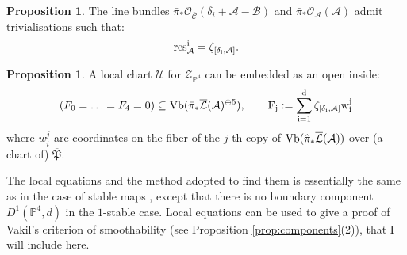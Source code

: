 \documentclass[11pt]{amsart}
\newcommand{\pazocal}{\mathcal}
\newcommand{\PP}{\mathbb P}
\newcommand{\OO}{\mathcal{O}}
\newcommand{\A}{\mathcal A}
\newcommand{\B}{\mathcal B}
\newcommand{\hP}{\overline{\mathfrak{P}}}
\newcommand{\hL}{\overline{\mathcal{L}}}
\theoremstyle{definition}
\newtheorem{prop}[thm]{Proposition}
\theoremstyle{definition}
\begin{document}
\begin{prop}\cite[Proposition 4.13]{HL}
The line bundles $\bar\pi_*\OO_{\overline{\mathcal C}}(\pazocal \delta_i+\A-\B)$ and $\bar\pi_*\OO_{\A}(\A) $ admit trivialisations such that:
\[\rm{res}^i_{\mathcal A}=\zeta_{[\delta_i,\A]}.\]
\end{prop}
\begin{prop}\label{prop:equations} \cite[Theorems 2.17-19]{HL}
A local chart $\pazocal U$ for $\mathcal Z_{\PP^4}$ can be embedded as an open inside:
\[ (F_0=\ldots=F_4=0)\subseteq \rm{Vb}(\bar{\pi}_*\hL(\A)^{\oplus 5}),\qquad F_j:=\sum_{i=1}^d \zeta_{[\delta_i,\pazocal A]}w_i^j \]
where $w_i^j$ are coordinates on the fiber of the $j$-th copy of $\rm{Vb}(\hat{\pi}_*\hL(\A))$ over (a chart of) $\hP$.
\end{prop}
The local equations and the method adopted to find them is essentially the same as in the case of stable maps \cite{HL}, except that there is no boundary component $D^1(\PP^4,d)$ in the $1$-stable case. Local equations can be used to give a proof of Vakil's criterion of smoothability (see Proposition \ref{prop:components}(2)), that I will include here.
\end{document}
